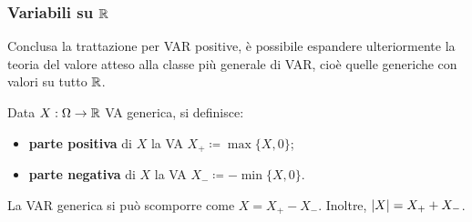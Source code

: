 \subsubsection{Variabili su $\mathbb R$}
Conclusa la trattazione per VAR positive, è possibile espandere ulteriormente la teoria del valore atteso alla classe più generale di VAR, cioè quelle generiche con valori su tutto $\mathbb R$.
\begin{defn}
  Data $X:\Omega \to \mathbb R$ VA generica, si definisce:
  \begin{itemize}
  \item \textbf{parte positiva} di $X$ la VA $X_+ \coloneqq \max\{X, 0\}$;
  \item \textbf{parte negativa} di $X$ la VA $X_- \coloneqq -\min\{X, 0\}$.
  \end{itemize}
  La VAR generica si può scomporre come $X = X_+ - X_-$.
  Inoltre, $\lvert X\rvert = X_+ + X_-$.
\end{defn}

